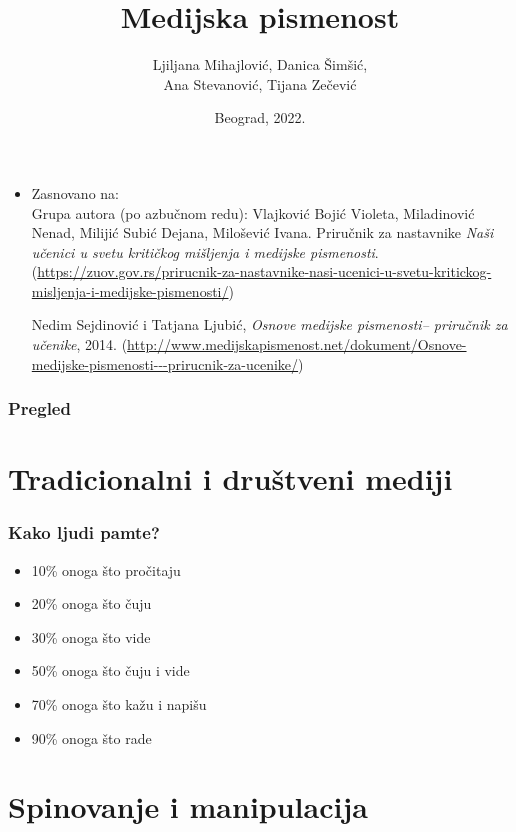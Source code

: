 \documentclass{beamer}
\title{Medijska pismenost}
\author{Ljiljana Mihajlović, Danica Šimšić,\\ Ana Stevanović, Tijana Zečević}
\institute{Matematički fakultet\\Univerzitet u Beogradu}
\date{
	\footnotesize{Beograd, 2022.}	
}
\begin{document}
\begin{frame}
	\thispagestyle{empty}
	\titlepage
\end{frame}

\addtocounter{framenumber}{-1}

\begin{frame}
	\begin{itemize}
		\item Zasnovano na:\\
		Grupa autora (po azbučnom redu): Vlajković Bojić Violeta, Miladinović Nenad, Milijić Subić Dejana, Milošević Ivana. Priručnik za nastavnike \emph{ Naši učenici u svetu kritičkog mišljenja i medijske pismenosti}.
		(\url{https://zuov.gov.rs/prirucnik-za-nastavnike-nasi-ucenici-u-svetu-kritickog-misljenja-i-medijske-pismenosti/})

  
            Nedim Sejdinović i Tatjana Ljubić, \emph{Osnove medijske pismenosti– priručnik za učenike}, 2014.
            (\url{http://www.medijskapismenost.net/dokument/Osnove-medijske-pismenosti---prirucnik-za-ucenike/})\\
  
	\end{itemize}
\end{frame}

\begin{frame}
	\frametitle{Pregled} %
	\tableofcontents[hidesubsections] 
\end{frame}

\section{Tradicionalni i društveni mediji}

\begin{frame}[fragile]\frametitle{Kako ljudi pamte?}
	\begin{itemize}	
		\item 10\% onoga što pročitaju
		\item 20\% onoga što čuju
		\item 30\% onoga što vide
		\item 50\% onoga što čuju i vide
		\item 70\% onoga što kažu i napišu
		\item 90\% onoga što rade
	\end{itemize}
\end{frame}

\section{Spinovanje i manipulacija}
\end{document}
